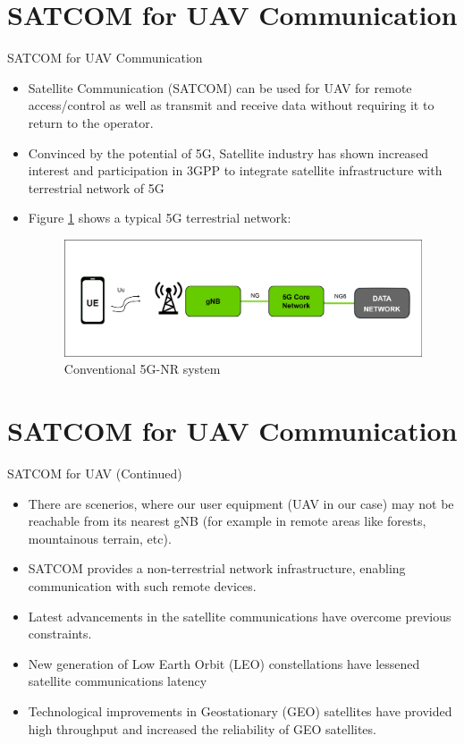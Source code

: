 \documentclass[xcolor=table]{beamer}
\begin{document}
\section{SATCOM for UAV Communication}
\begin{frame}{SATCOM for UAV Communication}
\begin{itemize}
	\item Satellite Communication (SATCOM) can be used for UAV for remote access/control as well as transmit and receive data without requiring it to return to the operator.
	\item Convinced by the potential of 5G, Satellite industry has shown increased interest and participation in 3GPP to integrate satellite infrastructure with terrestrial network of 5G
	\item Figure \ref{Conventional_5G} shows a typical 5G terrestrial network:
	\begin{figure}[h!]
  		\centering
  		\includegraphics[width=0.9\linewidth]{./figs/Conventional_5G.png}
  		\caption{Conventional 5G-NR system}
  		\label{Conventional_5G}
	\end{figure}
\end{itemize}
\end{frame} 

\section{SATCOM for UAV Communication}
\begin{frame}{SATCOM for UAV \small{(Continued})}
\begin{itemize}
	\item There are scenerios, where our user equipment (UAV in our case) may not be reachable from
its nearest gNB (for example in remote areas like forests, mountainous terrain, etc).
	\item SATCOM provides a non-terrestrial network infrastructure, enabling communication with such
remote devices.
	\item Latest advancements in the satellite communications have overcome previous constraints. 
 \item New generation of Low Earth Orbit (LEO) constellations have lessened satellite communications latency
\item Technological improvements in Geostationary (GEO) satellites have provided high throughput and increased the reliability of GEO satellites.
\end{itemize}
\end{frame} 
\end{document}
